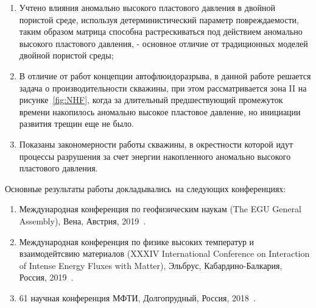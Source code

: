 {\novelty}
\begin{enumerate}
  \item Учтено влияния аномально высокого пластового давления в двойной пористой среде, используя детерминистический параметр повреждаемости, таким образом матрица способна растрескиваться под действием аномально высокого пластового давления, - основное отличие от традиционных моделей двойной пористой среды;
  \item В отличие от работ концепции автофлюидоразрыва, в данной работе решается задача о производительности скважины, при этом рассматривается зона II на рисунке~\ref{fig:NHF}, когда за длительный предшествующий промежуток времени накопилось аномально высокое пластовое давление, но инициации развития трещин еще не было.
  \item Показаны закономерности работы скважины, в окрестности которой идут процессы разрушения за счет энергии накопленного аномально высокого пластового давления.
\end{enumerate}






{\probation}
Основные результаты работы докладывались~на следующих конференциях:
\begin{enumerate}
  \item Международная конференция по геофизическим наукам (The EGU General Assembly), Вена, Австрия, 2019~\cite{eguconf}.
  \item Международная конференция по физике высоких температур и взаимодейтсвию материалов (XXXIV International Conference on Interaction of Intense Energy Fluxes with Matter), Эльбрус, Кабардино-Балкария, Россия, 2019~\cite{ivtanconf}.
  \item 61 научная конференция МФТИ, Долгопрудный, Россия, 2018~\cite{miptconf}.
\end{enumerate}

